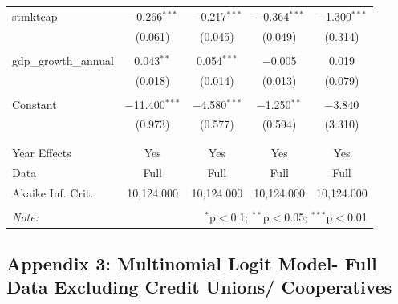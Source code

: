 \documentclass[a4paper, nobind]{templates/ociamthesis}
\begin{document}
\begin{table}[!htbp]
\begin{tabular}{@{\extracolsep{5pt}}lcccc}
 stmktcap & $-$0.266$^{***}$ & $-$0.217$^{***}$ & $-$0.364$^{***}$ & $-$1.300$^{***}$ \\ 
  & (0.061) & (0.045) & (0.049) & (0.314) \\ 
  & & & & \\ 
 gdp\_growth\_annual & 0.043$^{**}$ & 0.054$^{***}$ & $-$0.005 & 0.019 \\ 
  & (0.018) & (0.014) & (0.013) & (0.079) \\ 
  & & & & \\ 
 Constant & $-$11.400$^{***}$ & $-$4.580$^{***}$ & $-$1.250$^{**}$ & $-$3.840 \\ 
  & (0.973) & (0.577) & (0.594) & (3.310) \\ 
  & & & & \\ 
\hline \\[-1.8ex] 
Year Effects & Yes & Yes & Yes & Yes \\ 
Data & Full & Full & Full & Full \\ 
Akaike Inf. Crit. & 10,124.000 & 10,124.000 & 10,124.000 & 10,124.000 \\ 
\hline 
\hline \\[-1.8ex] 
\textit{Note:}  & \multicolumn{4}{r}{$^{*}$p$<$0.1; $^{**}$p$<$0.05; $^{***}$p$<$0.01} \\ 
\end{tabular} 
\end{table}

\newpage

\hypertarget{appendix-3-multinomial-logit-model--full-data-excluding-credit-unions-cooperatives}{%
\subsection{Appendix 3: Multinomial Logit Model- Full Data Excluding Credit Unions/ Cooperatives}\label{appendix-3-multinomial-logit-model--full-data-excluding-credit-unions-cooperatives}}
\end{document}
